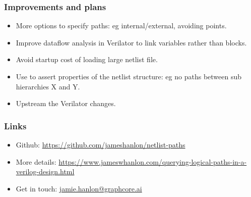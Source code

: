 \documentclass[professionalfonts]{beamer}
\begin{document}
\begin{frame}
\frametitle{Improvements and plans}
  \begin{itemize}
  \item More options to specify paths: eg internal/external, avoiding points.
  \item Improve dataflow analysis in Verilator to link variables rather than
    blocks.
  \item Avoid startup cost of loading large netlist file.
  \item Use to assert properties of the netlist structure: eg no paths between
    sub hierarchies X and Y.
  \item Upstream the Verilator changes.
  \end{itemize}
\end{frame}

\begin{frame}
\frametitle{Links}
  \begin{itemize}
  \item Github:
    \url{https://github.com/jameshanlon/netlist-paths}
  \item More details:
    \url{https://www.jameswhanlon.com/querying-logical-paths-in-a-verilog-design.html}
  \item Get in touch:
    \url{jamie.hanlon@graphcore.ai}
  \end{itemize}
\end{frame}
\end{document}
